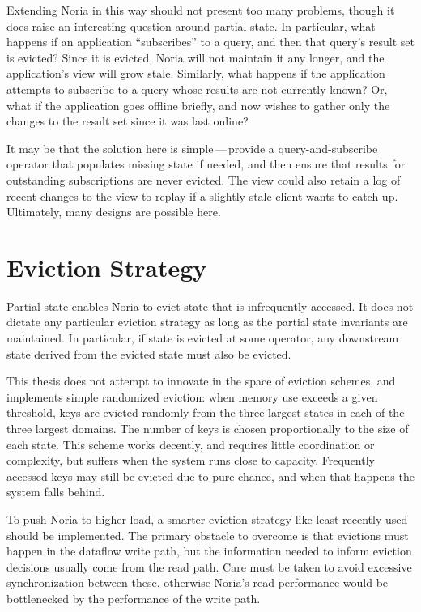 Extending Noria in this way should not present too many problems, though it does
raise an interesting question around partial state. In particular, what happens
if an application ``subscribes'' to a query, and then that query's result set is
evicted? Since it is evicted, Noria will not maintain it any longer, and the
application's view will grow stale. Similarly, what happens if the application
attempts to subscribe to a query whose results are not currently known? Or, what
if the application goes offline briefly, and now wishes to gather only the
changes to the result set since it was last online?

It may be that the solution here is simple\,---\,provide a query-and-subscribe
operator that populates missing state if needed, and then ensure that results
for outstanding subscriptions are never evicted. The view could also retain a
log of recent changes to the view to replay if a slightly stale client wants to
catch up. Ultimately, many designs are possible here.

\section{Eviction Strategy}

Partial state enables Noria to evict state that is infrequently accessed. It
does not dictate any particular eviction strategy as long as the partial state
invariants are maintained. In particular, if state is evicted at some operator,
any downstream state derived from the evicted state must also be evicted.

This thesis does not attempt to innovate in the space of eviction schemes, and
implements simple randomized eviction: when memory use exceeds a given
threshold, keys are evicted randomly from the three largest states in each of
the three largest domains. The number of keys is chosen proportionally to the
size of each state. This scheme works decently, and requires little coordination
or complexity, but suffers when the system runs close to capacity. Frequently
accessed keys may still be evicted due to pure chance, and when that happens the
system falls behind.

To push Noria to higher load, a smarter eviction strategy like least-recently
used should be implemented. The primary obstacle to overcome is that evictions
must happen in the dataflow write path, but the information needed to inform
eviction decisions usually come from the read path. Care must be taken to avoid
excessive synchronization between these, otherwise Noria's read performance
would be bottlenecked by the performance of the write path.

